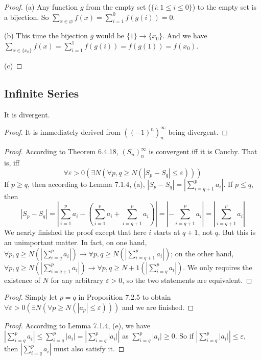 \begin{proof}
(a) 
Any function $g$ from the empty set ($\{i:1\leq i \leq 0\}$) to the empty set is a bijection. So $\sum_{x \in \varnothing}{f(x)} = \sum_{i=1}^0{f(g(i))} = 0$.

(b)
This time the bijection $g$ would be $\{1\} \to \{x_0\}$. And we have $\sum_{x \in \{x_0\}}{f(x)} = \sum_{i=1}^1{f(g(i))} = f(g(1)) = f(x_0)$.

(c)

\end{proof}

\subsection{Infinite Series}
It is divergent.
\begin{proof}
It is immediately derived from $((-1)^n)^\infty_n$ being divergent.
\end{proof}


\begin{proof}
According to Theorem 6.4.18, $(S_n)_n^\infty$ is convergent iff it is Cauchy. That is, iff 
\[
\forall \varepsilon>0(\exists N(\forall p,q\geq N(|S_p-S_q|\leq \varepsilon)))
\]
If $p\geq q$, then according to Lemma 7.1.4, (a), $|S_p-S_q| = |\sum_{i=q+1}^p{a_i}|$. If $p \leq q$, then 
\[
|S_p-S_q| = \left|\sum_{i=1}^p{a_i}-(\sum_{i=1}^p{a_i}+\sum_{i=q+1}^p{a_i})\right| = \left|-\sum_{i=q+1}^p{a_i}\right| = \left|\sum_{i=q+1}^p{a_i}\right|
\]
We nearly finished the proof except that here $i$ starts at $q+1$, not $q$. But this is an unimportant matter. In fact, on one hand, $\forall p,q \geq N(|\sum_{i=q}^p{a_i}|) \rightarrow \forall p,q \geq N(|\sum_{i=q+1}^p{a_i}|)$; on the other hand, $\forall p,q \geq N(|\sum_{i=q+1}^p{a_i}|) \rightarrow \forall p,q \geq N+1(|\sum_{i=q}^p{a_i}|)$. We only requires the existence of $N$ for any arbitrary $\varepsilon >0$, so the two statements are equivalent.
\end{proof}

\begin{proof}
Simply let $p=q$ in Proposition 7.2.5 to obtain $\forall \varepsilon >0 (\exists N(\forall p\geq N(|a_p|\leq \varepsilon)))$ and we are finished.
\end{proof}

\begin{proof}
According to Lemma 7.1.4, (e), we have $|\sum_{i=q}^p{a_i}| \leq \sum_{i=q}^p{|a_i|} = |\sum_{i=q}^p{|a_i|}|$ as $\sum_{i=q}^p{|a_i|}\geq 0$. So if $|\sum_{i=q}^p{|a_i|}| \leq \varepsilon$, then $|\sum_{i=q}^p{a_i}|$ must also satisfy it.
\end{proof}

